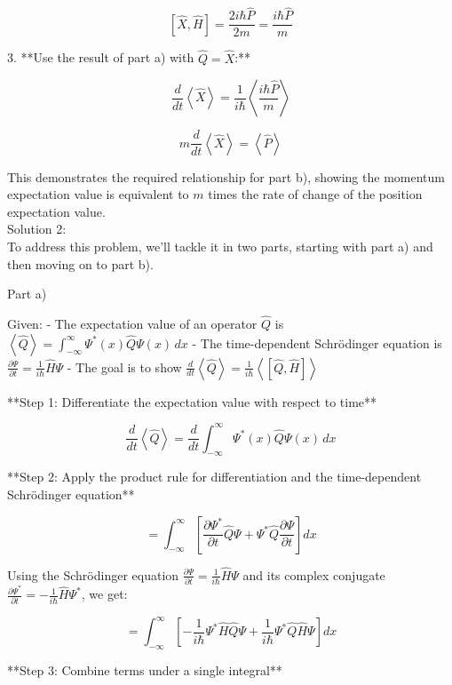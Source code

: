 \documentclass[a4paper,11pt]{article}
\begin{document}
\[ \left[ \hat{X}, \hat{H}\right] = \frac{2i\hbar\hat{P}}{2m} = \frac{i\hbar\hat{P}}{m} \]

3. **Use the result of part a) with \( \hat{Q} = \hat{X} \):**

\[ \frac{d}{dt}\left<\hat{X}\right> = \frac{1}{i\hbar}\left< \frac{i\hbar\hat{P}}{m} \right> \]

\[ m\frac{d}{dt}\left<\hat{X}\right> = \left<\hat{P}\right> \]

This demonstrates the required relationship for part b), showing the momentum expectation value is equivalent to \( m \) times the rate of change of the position expectation value. \\ 

\noindent Solution 2: \\

To address this problem, we'll tackle it in two parts, starting with part a) and then moving on to part b).

Part a)

Given:
- The expectation value of an operator \( \hat{Q} \) is \( \left< \hat{Q} \right> = \int_{-\infty}^{\infty} \Psi^{*}(x) \hat{Q} \Psi(x) \, dx \)
- The time-dependent Schrödinger equation is \( \frac{\partial\Psi}{\partial t} = \frac{1}{i\hbar}\hat{H}\Psi \)
- The goal is to show \( \frac{d}{dt}\left<\hat{Q}\right> = \frac{1}{i\hbar}\left< \left[ \hat{Q}, \hat{H} \right] \right> \)

**Step 1: Differentiate the expectation value with respect to time**

\[
\frac{d}{dt}\left<\hat{Q}\right> = \frac{d}{dt}\int_{-\infty}^{\infty} \Psi^{*}(x) \hat{Q} \Psi(x) \, dx
\]

**Step 2: Apply the product rule for differentiation and the time-dependent Schrödinger equation**

\[
= \int_{-\infty}^{\infty} \left[ \frac{\partial \Psi^{*}}{\partial t} \hat{Q} \Psi + \Psi^{*} \hat{Q} \frac{\partial \Psi}{\partial t} \right] dx
\]

Using the Schrödinger equation \( \frac{\partial\Psi}{\partial t} = \frac{1}{i\hbar}\hat{H}\Psi \) and its complex conjugate \( \frac{\partial\Psi^{*}}{\partial t} = -\frac{1}{i\hbar}\hat{H}\Psi^{*} \), we get:

\[
= \int_{-\infty}^{\infty} \left[ -\frac{1}{i\hbar} \Psi^{*} \hat{H} \hat{Q} \Psi + \frac{1}{i\hbar} \Psi^{*} \hat{Q} \hat{H} \Psi \right] dx
\]

**Step 3: Combine terms under a single integral**
\end{document}
